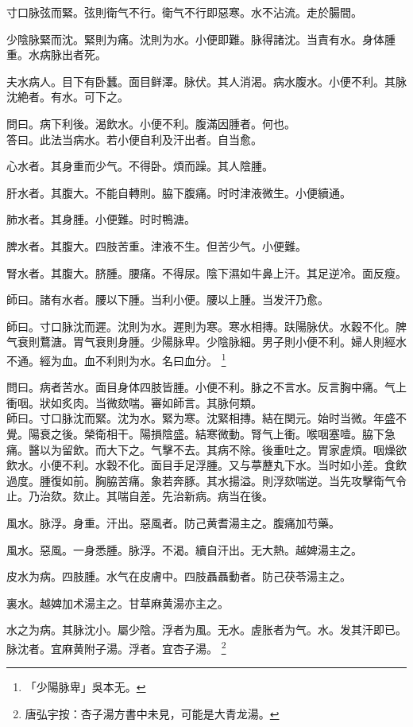 \documentclass[12pt,twoside,UTF8,b5paper]{ctexbook}
\begin{document}
寸口脉弦而緊。弦則衛气不行。{衛气不行}即惡寒。水不沾流。走於腸間。

少陰脉緊而沈。緊則为痛。沈則为水。小便即難。脉得諸沈。当責有水。身体腫重。水病脉出者死。

夫水病人。目下有卧蠶。面目鲜澤。脉伏。其人消渴。病水腹水。小便不利。其脉沈絶者。有水。可下之。

問曰。病下利後。渴飲水。小便不利。腹滿因腫者。何也。\\
答曰。此法当病水。若小便自利及汗出者。自当愈。

心水者。其身重而少气。不得卧。煩而躁。其人陰腫。

肝水者。其腹大。不能自轉則。脇下腹痛。时时津液微生。小便續通。

肺水者。其身腫。小便難。时时鴨溏。

脾水者。其腹大。四肢苦重。津液不生。但苦少气。小便難。

腎水者。其腹大。脐腫。腰痛。不得尿。陰下濕如牛鼻上汗。其足逆冷。面反瘦。

師曰。諸有水者。腰以下腫。当利小便。腰以上腫。当发汗乃愈。

師曰。寸口脉沈而遲。沈則为水。遲則为寒。寒水相摶。趺陽脉伏。水穀不化。脾气衰則鶩溏。胃气衰則身腫。少陽脉卑。少陰脉細。男子則小便不利。婦人則經水不通。經为血。血不利則为水。名曰血分。
	\footnote{「少陽脉卑」吳本无。}

問曰。病者苦水。面目身体四肢皆腫。小便不利。脉之不言水。反言胸中痛。气上衝咽。狀如炙肉。当微欬喘。審如師言。其脉何類。\\
師曰。寸口脉沈而緊。沈为水。緊为寒。沈緊相摶。結在関元。始时当微。年盛不覺。陽衰之後。榮衛相干。陽損陰盛。結寒微動。腎气上衝。喉咽塞噎。脇下急痛。醫以为留飲。而大下之。气擊不去。其病不除。後重吐之。胃家虗煩。咽燥欲飲水。小便不利。水穀不化。面目手足浮腫。又与葶藶丸下水。当时如小差。食飲過度。腫復如前。胸脇苦痛。象若奔豚。其水揚溢。則浮欬喘逆。当先攻擊衛气令止。乃治欬。欬止。其喘自差。先治新病。病当在後。

風水。脉浮。身重。汗出。惡風者。防己黄耆湯主之。腹痛加芍藥。

風水。惡風。一身悉腫。脉浮。不渴。續自汗出。无大熱。越婢湯主之。

皮水为病。四肢腫。水气在皮膚中。四肢聶聶動者。防己茯苓湯主之。

裏水。越婢加术湯主之。甘草麻黄湯亦主之。

水之为病。其脉沈小。屬少陰。浮者为風。无水。虗胀者为气。水。发其汗即已。脉沈者。宜麻黄附子湯。浮者。宜杏子湯。
	\footnote{唐弘宇按：杏子湯方書中未見，可能是大青龙湯。}
\end{document}
